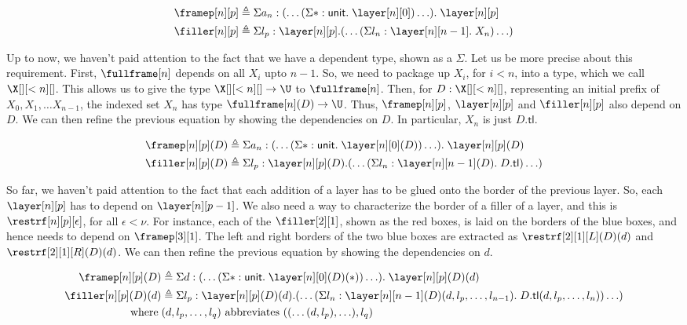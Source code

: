 \documentclass[10pt]{art.cls/art}
\newcommand{\unittype}{\ensuremath{\mathsf{unit}}}
\newcommand{\unitpoint}{\ensuremath{\ast}}
\newcommand{\defeq}{\ensuremath{\triangleq}}
\newcommand{\tl}{\ensuremath{\mathsf{tl}}}
\begin{document}
\begin{align*}
  \framep[n][p] & \defeq \Sigma a_n : (\ldots (\Sigma \unitpoint : \unittype .\; \layer[n][0]) \ldots) .\; \layer[n][p] \\
  \filler[n][p] & \defeq \Sigma l_p : \layer[n][p] . (\ldots (\Sigma l_n : \layer[n][n - 1] .\; X_n) \ldots)
\end{align*}

Up to now, we haven't paid attention to the fact that we have a dependent type, shown as a $\Sigma$. Let us be more precise about this requirement. First, $\fullframe[n]$ depends on all $X_i$ upto $n - 1$. So, we need to package up $X_i$, for $i < n$, into a type, which we call $\X[][<n][]$. This allows us to give the type $\X[][<n][] \rightarrow \U$ to $\fullframe[n]$. Then, for $D: \X[][<n][]$, representing an initial prefix of $X_0, X_1, \ldots X_{n - 1}$, the indexed set $X_n$ has type $\fullframe[n](D) \rightarrow \U$. Thus, $\framep[n][p]$, $\layer[n][p]$ and $\filler[n][p]$ also depend on $D$. We can then refine the previous equation by showing the dependencies on $D$. In particular, $X_n$ is just $D.\tl$.

\begin{align*}
  \framep[n][p](D) & \defeq \Sigma a_n : (\ldots (\Sigma \unitpoint : \unittype .\; \layer[n][0](D)) \ldots) .\; \layer[n][p](D) \\
  \filler[n][p](D) & \defeq \Sigma l_p : \layer[n][p](D) . (\ldots (\Sigma l_n : \layer[n][n - 1](D) .\; D.\tl) \ldots)
\end{align*}

So far, we haven't paid attention to the fact that each addition of a layer has to be glued onto the border of the previous layer. So, each $\layer[n][p]$ has to depend on $\layer[n][p - 1]$. We also need a way to characterize the border of a filler of a layer, and this is $\restrf[n][p][\epsilon]$, for all $\epsilon < \nu$. For instance, each of the $\filler[2][1]$, shown as the red boxes, is laid on the borders of the blue boxes, and hence needs to depend on $\framep[3][1]$. The left and right borders of the two blue boxes are extracted as $\restrf[2][1][L](D)(d)$ and $\restrf[2][1][R](D)(d)$. We can then refine the previous equation by showing the dependencies on $d$.

\begin{align*}
  \framep[n][p](D)    & \defeq \Sigma d : (\ldots (\Sigma \unitpoint : \unittype .\; \layer[n][0](D)(\unitpoint)) \ldots) .\; \layer[n][p](D)(d)                              \\
  \filler[n][p](D)(d) & \defeq \Sigma l_p : \layer[n][p](D)(d) . (\ldots (\Sigma l_n : \layer[n][n - 1](D)(d, l_p, \ldots, l_{n - 1}) .\; D.\tl(d, l_p, \ldots, l_n)) \ldots) \\
  \text{where}\;      & (d, l_p, \ldots, l_q) \text{ abbreviates } ((\ldots(d, l_p), \ldots), l_q)
\end{align*}
\end{document}
